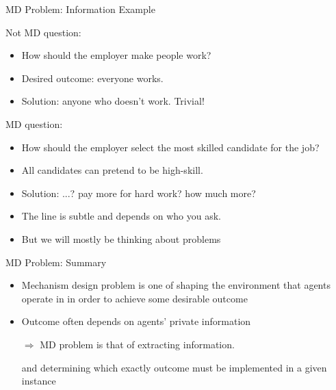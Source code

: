 \documentclass[english,10pt
,aspectratio=169
]{beamer}
\begin{document}
\begin{frame}{MD Problem: Information Example}
\begin{exampleblock}{Not MD question:}
	\begin{itemize}
		\item How should the employer \alert<1>{make people work}?
		\item Desired outcome: everyone works.
		\item Solution:  anyone who doesn't work. Trivial!
	\end{itemize}
\end{exampleblock}
\pause
\begin{exampleblock}{MD question:}
	\begin{itemize}
		\item How should the employer \alert<2>{select the most skilled candidate for the job}?
		\item All candidates can pretend to be high-skill.
		\item Solution: ...? pay more for hard work? how much more?
	\end{itemize}
\end{exampleblock}
\pause
\begin{itemize}
	\item The line is subtle and depends on who you ask.
	\item But we will mostly be thinking about  problems
\end{itemize}
\end{frame}


\begin{frame}{MD Problem: Summary}
\begin{itemize}
	\item Mechanism design problem is one of shaping the environment that agents operate in in order to achieve some desirable outcome
	\item Outcome often depends on agents' private information 
	
	$\Rightarrow$ MD problem is that of extracting information.
	
	and determining which exactly outcome must be implemented in a given instance
\end{itemize}
\end{frame}
\end{document}
